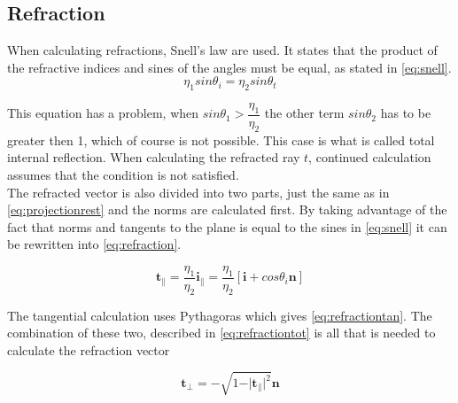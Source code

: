 \documentclass[a4paper, 12pt]{report}
\begin{document}

\subsection{Refraction}
When calculating refractions, Snell's law are used.
It states that the product of the refractive indices and sines of the angles must be equal, as stated in \autoref{eq:snell}.\\

\begin{equation} \label{eq:snell}
\eta_1 sin \theta_i = \eta_2 sin \theta_t
\end{equation}

This equation has a problem, when $ sin \theta_1 > \dfrac{\eta_1}{\eta_2} $
the other term $ sin \theta_2 $ has to be greater then 1, which of course is not possible.
This case is what is called total internal reflection.
When calculating the refracted ray $ t $, continued calculation assumes that the condition is not satisfied.\\

The refracted vector is also divided into two parts, just the same as in \autoref{eq:projectionrest} and the norms are calculated first. 
By taking advantage of the fact that norms and tangents to the plane is equal to the sines in \autoref{eq:snell} it can be rewritten into \autoref{eq:refraction}.

\begin{equation} \label{eq:refraction}
\mathbf{t}_\| = \frac{\eta_1}{\eta_2} \mathbf{i}_\| = \frac{\eta_1}{\eta_2} 
[\mathbf{i} + cos \theta_i \mathbf{n}]
\end{equation}

The tangential calculation uses Pythagoras which gives \autoref{eq:refractiontan}. 
The combination of these two, described in \autoref{eq:refractiontot} is all that is needed to calculate the refraction vector 

\begin{equation} \label{eq:refractiontan}
\mathbf{t}_\bot = - \sqrt{1 - \vert \mathbf{t}_\| \vert ^2}\mathbf{n}
\end{equation}
\end{document}
